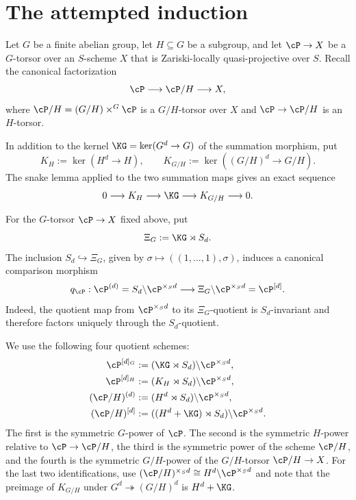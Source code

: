 \section{The attempted induction}
\label{sec:as_induction_preliminaries}

Let $G$ be a finite abelian group, let $H\subseteq G$ be a subgroup, and let
$\cP\to X$ be a $G$-torsor over an $S$-scheme $X$ that is Zariski-locally
quasi-projective over $S$. Recall the canonical factorization
\[
\cP\longrightarrow\cP/H\longrightarrow X,
\]
where $\cP/H=(G/H)\times^G\cP$ is a $G/H$-torsor over $X$ and
$\cP\to\cP/H$ is an $H$-torsor.

In addition to the kernel $\KG=\ker(G^d\to G)$ of the summation morphism,
put
\[
K_H:=\ker(H^d\to H),\qquad
K_{G/H}:=\ker((G/H)^d\to G/H).
\]
The snake lemma applied to the two summation maps gives an exact sequence
\begin{equation}\label{eq:summation_kernels_ses}
0\longrightarrow K_H\longrightarrow\KG\longrightarrow K_{G/H}
\longrightarrow0.
\end{equation}

\begin{construction}
\label{construction:symmetric_power_comparison}
For the $G$-torsor $\cP\to X$ fixed above, put
\[
\Xi_G:=\KG\rtimes S_d.
\]
The inclusion $S_d\hookrightarrow\Xi_G$, given by
$\sigma\mapsto((1,\ldots,1),\sigma)$, induces a canonical comparison
morphism
\[
q_{\cP}:\cP^{(d)}
=S_d\backslash\cP^{\times_S d}
\longrightarrow
\Xi_G\backslash\cP^{\times_S d}
=\cP^{[d]}.
\]
Indeed, the quotient map from $\cP^{\times_S d}$ to its $\Xi_G$-quotient
is $S_d$-invariant and therefore factors uniquely through the
$S_d$-quotient.
\end{construction}

We use the following four quotient schemes:
\begin{align*}
  \cP^{[d]_G}&:=(\KG\rtimes S_d)\backslash\cP^{\times_S d},\\
  \cP^{[d]_H}&:=(K_H\rtimes S_d)\backslash\cP^{\times_S d},\\
  (\cP/H)^{(d)}&:=(H^d\rtimes S_d)\backslash\cP^{\times_S d},\\
  (\cP/H)^{[d]}&:=((H^d+\KG)\rtimes S_d)
      \backslash\cP^{\times_S d}.
\end{align*}
The first is the symmetric $G$-power of $\cP$. The second is the symmetric
$H$-power relative to $\cP\to\cP/H$, the third is the symmetric power of the
scheme $\cP/H$, and the fourth is the symmetric $G/H$-power of the
$G/H$-torsor $\cP/H\to X$. For the last two identifications, use
$(\cP/H)^{\times_S d}\cong H^d\backslash\cP^{\times_S d}$ and note that the
preimage of $K_{G/H}$ under $G^d\twoheadrightarrow(G/H)^d$ is
$H^d+\KG$.

